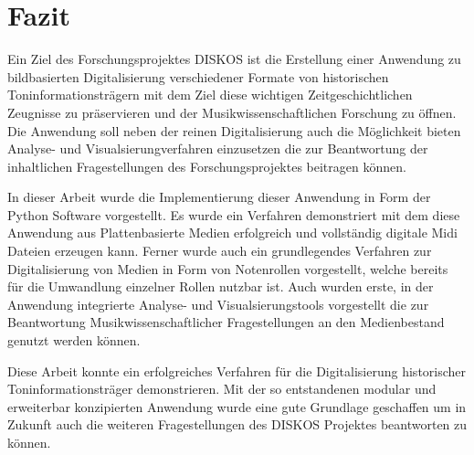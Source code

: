 \section{Fazit}

Ein Ziel des Forschungsprojektes DISKOS ist die Erstellung einer Anwendung zu bildbasierten Digitalisierung verschiedener Formate von historischen Toninformationsträgern mit dem Ziel diese wichtigen Zeitgeschichtlichen Zeugnisse zu präservieren und der Musikwissenschaftlichen Forschung zu öffnen.
Die Anwendung soll neben der reinen Digitalisierung auch die Möglichkeit bieten Analyse- und Visualsierungverfahren einzusetzen die zur Beantwortung der inhaltlichen Fragestellungen des Forschungsprojektes beitragen können.

In dieser Arbeit wurde die Implementierung dieser Anwendung in Form der Python Software  vorgestellt.
Es wurde ein Verfahren demonstriert mit dem diese Anwendung aus Plattenbasierte Medien erfolgreich und vollständig digitale Midi Dateien erzeugen kann.
Ferner wurde auch ein grundlegendes Verfahren zur Digitalisierung von Medien in Form von Notenrollen vorgestellt, welche bereits für die Umwandlung einzelner Rollen nutzbar ist.
Auch wurden erste, in der Anwendung integrierte Analyse- und Visualsierungstools vorgestellt die zur Beantwortung Musikwissenschaftlicher Fragestellungen an den Medienbestand genutzt werden können.

Diese Arbeit konnte ein erfolgreiches Verfahren für die Digitalisierung historischer Toninformationsträger demonstrieren.
Mit der so entstandenen modular und erweiterbar konzipierten Anwendung wurde eine gute Grundlage geschaffen um in Zukunft auch die weiteren Fragestellungen des DISKOS Projektes beantworten zu können.